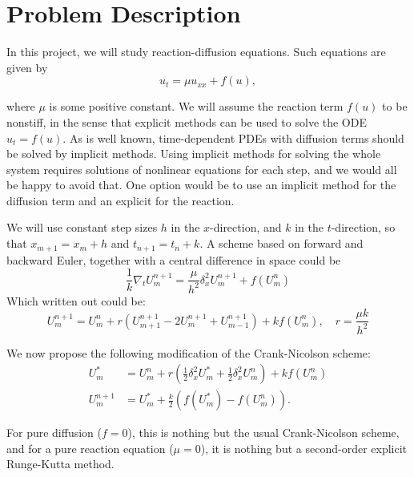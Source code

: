 \section{Problem Description}

In this project, we will study reaction-diffusion equations. Such equations are given by
\begin{equation}
  u_t = \mu u_{xx} + f(u),
\end{equation}

where $\mu$ is some positive constant.
We will assume the reaction term $f(u)$ to be nonstiff, in the sense that explicit methods can be used to solve the ODE $u_t = f(u)$. As is well known, time-dependent PDEs with diffusion terms should be solved by implicit methods. Using implicit methods for solving the whole system requires solutions of nonlinear equations for each step, and we would all be happy to avoid that. One option would be to use an implicit method for the diffusion term and an explicit for the reaction.

We will use constant step sizes $h$ in the $x$-direction, and $k$ in the $t$-direction, so that $x_{m+1} = x_m + h$ and $t_{n+1} = t_n + k$. A scheme based on forward and backward Euler, together with a central difference in space could be
\begin{equation}
  \frac{1}{k} \nabla_t U_m^{n+1}  = \frac{\mu}{h^2} \delta_x^2 U_m^{n+1} + f(U_m^n)
\end{equation}
Which written out could be:
\begin{equation}
  U_m^{n+1}  = U_m^n + r \left( U_{m+1}^{n+1} - 2 U_m^{n+1} + U_{m-1}^{n+1} \right) + k f(U_m^n), \quad r = \frac{\mu k}{h^2}
\end{equation}

We now propose the following modification of the Crank-Nicolson scheme:
\begin{align*}
  U_m^*     & = U_m^n + r \left( \frac{1}{2} \delta_x^2 U_m^* + \frac{1}{2} \delta_x^2 U_m^n \right) + k f(U_m^n) \\
  U_m^{n+1} & = U_m^* + \frac{k}{2} \left( f(U_m^*) - f(U_m^n) \right).
\end{align*}

For pure diffusion ($f = 0$), this is nothing but the usual Crank-Nicolson scheme, and for a pure reaction equation ($\mu = 0$), it is nothing but a second-order explicit Runge-Kutta method.


